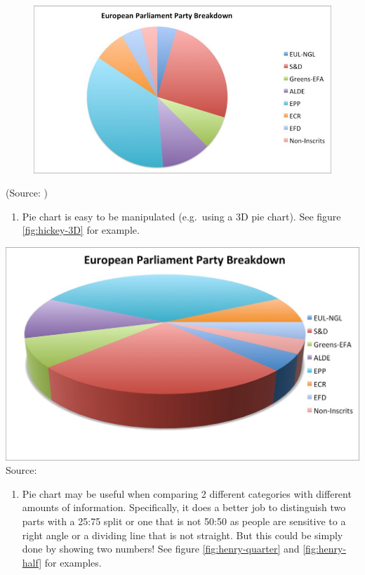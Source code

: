 \documentclass[]{book}
\providecommand{\tightlist}{%
  \setlength{\itemsep}{0pt}\setlength{\parskip}{0pt}}
\theoremstyle{definition}
\theoremstyle{definition}
\theoremstyle{definition}
\theoremstyle{remark}
\begin{document}
\begin{figure}
\centering
\includegraphics{images/hickey-breakdown.jpg}
\caption{}
\end{figure}

(Source: \citep{hickey-pie-worst})

\begin{enumerate}
\def\labelenumi{\arabic{enumi}.}
\setcounter{enumi}{2}
\tightlist
\item
  Pie chart is easy to be manipulated (e.g.~using a 3D pie chart). See
  figure \ref{fig:hickey-3D} for example.
\end{enumerate}

\includegraphics{images/hickey-3D.jpg} Source: \citep{hickey-pie-worst}

\begin{enumerate}
\def\labelenumi{\arabic{enumi}.}
\setcounter{enumi}{3}
\tightlist
\item
  Pie chart may be useful when comparing 2 different categories with
  different amounts of information. Specifically, it does a better job
  to distinguish two parts with a 25:75 split or one that is not 50:50
  as people are sensitive to a right angle or a dividing line that is
  not straight. But this could be simply done by showing two numbers!
  See figure \ref{fig:henry-quarter} and \ref{fig:henry-half} for
  examples.
\end{enumerate}
\end{document}
